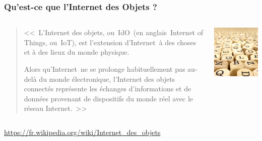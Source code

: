 \documentclass[aspectratio=169,utf8]{beamer}
\begin{document}
\begin{frame}
  \frametitle{Qu’est-ce que l’Internet des Objets ?}
  \begin{columns}
    \begin{column}{.8\textwidth}
      \begin{quotation}
        <<~L'Internet des objets, ou IdO (en anglais Internet of Things, ou IoT), est l'extension d'Internet à des choses et à des lieux du monde physique.
          
        Alors qu'Internet ne se prolonge habituellement pas au-delà du monde électronique, l'Internet des objets connectés représente les échanges d'informations et de données provenant de dispositifs du monde réel avec le réseau Internet.~>>
      \end{quotation}
    \end{column}
    \begin{column}{.2\textwidth}
      \includegraphics[width=\textwidth]{definition.jpg}
    \end{column}
  \end{columns}

  \hfill{\scriptsize\url{https://fr.wikipedia.org/wiki/Internet_des_objets}}
\end{frame}
\end{document}
